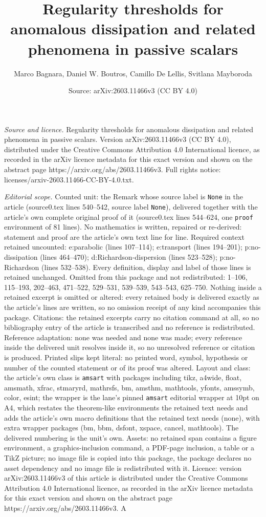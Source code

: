 \documentclass[10pt,a4paper]{amsart}
\title[Regularity thresholds for anomalous dissipation and related ]{Regularity thresholds for anomalous dissipation and related phenomena in passive scalars}
\author{Marco Bagnara, Daniel W. Boutros, Camillo De Lellis, Svitlana Mayboroda}
\date{Source: arXiv:2603.11466v3 (CC BY 4.0)}
\begin{document}
\maketitle

\noindent\emph{Source and licence.} Regularity thresholds for anomalous dissipation and related phenomena in passive scalars. Version arXiv:2603.11466v3 (CC BY 4.0), distributed under the Creative Commons Attribution 4.0 International licence, as recorded in the arXiv licence metadata for this exact version and shown on the abstract page https://arxiv.org/abs/2603.11466v3. Full rights notice: licenses/arxiv-2603.11466-CC-BY-4.0.txt.\par\smallskip

\noindent\textit{Editorial scope.} Counted unit: the Remark whose source label is \texttt{None} in the article (source0.tex lines 540--542, source label \texttt{None}), delivered together with the article's own complete original proof of it (source0.tex lines 544--624, one \texttt{proof} environment of 81 lines). No mathematics is written, repaired or re-derived: statement and proof are the article's own text line for line. Required context retained uncounted: e:parabolic (lines 107--114); e:transport (lines 194--201); p:no-dissipation (lines 464--470); d:Richardson-dispersion (lines 523--528); p:no-Richardson (lines 532--538). Every definition, display and label of those lines is retained unchanged. Omitted from this package and not redistributed: 1--106, 115--193, 202--463, 471--522, 529--531, 539--539, 543--543, 625--750. Nothing inside a retained excerpt is omitted or altered: every retained body is delivered exactly as the article's lines are written, so no omission receipt of any kind accompanies this package. Citations: the retained excerpts carry no citation command at all, so no bibliography entry of the article is transcribed and no reference is redistributed. Reference adaptation: none was needed and none was made; every reference inside the delivered unit resolves inside it, so no unresolved reference or citation is produced. Printed slips kept literal: no printed word, symbol, hypothesis or number of the counted statement or of its proof was altered. Layout and class: the article's own class is \texttt{amsart} with packages including tikz, a4wide, float, amsmath, xfrac, stmaryrd, mathrsfs, bm, amsthm, mathtools, yfonts, amssymb, color, esint; the wrapper is the lane's pinned \texttt{amsart} editorial wrapper at 10pt on A4, which restates the theorem-like environments the retained text needs and adds the article's own macro definitions that the retained text needs (none), with extra wrapper packages (bm, bbm, dsfont, xspace, cancel, mathtools). The delivered numbering is the unit's own. Assets: no retained span contains a figure environment, a graphics-inclusion command, a PDF-page inclusion, a table or a TikZ picture; no image file is copied into this package, the package declares no asset dependency and no image file is redistributed with it. Licence: version arXiv:2603.11466v3 of this article is distributed under the Creative Commons Attribution 4.0 International licence, as recorded in the arXiv licence metadata for this exact version and shown on the abstract page https://arxiv.org/abs/2603.11466v3. A 
\end{document}
